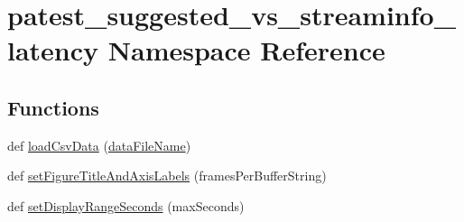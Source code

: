 \hypertarget{namespacepatest__suggested__vs__streaminfo__latency}{}\section{patest\+\_\+suggested\+\_\+vs\+\_\+streaminfo\+\_\+latency Namespace Reference}
\label{namespacepatest__suggested__vs__streaminfo__latency}
\subsection*{Functions}
\begin{DoxyCompactItemize}
\item 
def \hyperlink{namespacepatest__suggested__vs__streaminfo__latency_a7424dffa251f484c3101f5b560922137}{load\+Csv\+Data} (\hyperlink{namespacepatest__suggested__vs__streaminfo__latency_affbd9ac2873049fcdadb2cf2aad0949e}{data\+File\+Name})
\item 
def \hyperlink{namespacepatest__suggested__vs__streaminfo__latency_a1cae66a1750a390be6d53d2f255727dc}{set\+Figure\+Title\+And\+Axis\+Labels} (frames\+Per\+Buffer\+String)
\item 
def \hyperlink{namespacepatest__suggested__vs__streaminfo__latency_a60b4bdc746962bf47487d85b3206dbbf}{set\+Display\+Range\+Seconds} (max\+Seconds)
\end{DoxyCompactItemize}
